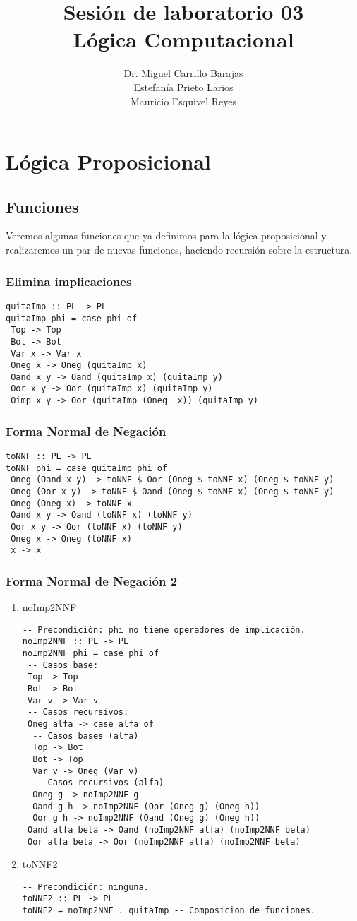 \documentclass[11pt]{article}
\author{Dr. Miguel Carrillo Barajas \\
Estefanía Prieto Larios \\
Mauricio Esquivel Reyes \\
}
\date{}
\title{Sesión de laboratorio 03 \\
Lógica Computacional}
\begin{document}
\maketitle
\section{Lógica Proposicional}
\label{sec:orgcdc3468}
\subsection{Funciones}
\label{sec:org6827b8f}
Veremos algunas funciones que ya definimos para la lógica proposicional y 
realizaremos un par de nuevas funciones, haciendo recursión sobre la estructura.
\subsubsection{Elimina implicaciones}
\label{sec:org8fbe9b7}
\begin{verbatim}
quitaImp :: PL -> PL
quitaImp phi = case phi of
 Top -> Top
 Bot -> Bot
 Var x -> Var x
 Oneg x -> Oneg (quitaImp x)
 Oand x y -> Oand (quitaImp x) (quitaImp y)
 Oor x y -> Oor (quitaImp x) (quitaImp y)
 Oimp x y -> Oor (quitaImp (Oneg  x)) (quitaImp y)
\end{verbatim}
\subsubsection{Forma Normal de Negación}
\label{sec:org7b1a26e}
\begin{verbatim}
toNNF :: PL -> PL
toNNF phi = case quitaImp phi of
 Oneg (Oand x y) -> toNNF $ Oor (Oneg $ toNNF x) (Oneg $ toNNF y)
 Oneg (Oor x y) -> toNNF $ Oand (Oneg $ toNNF x) (Oneg $ toNNF y)
 Oneg (Oneg x) -> toNNF x
 Oand x y -> Oand (toNNF x) (toNNF y)
 Oor x y -> Oor (toNNF x) (toNNF y)
 Oneg x -> Oneg (toNNF x)
 x -> x
\end{verbatim}
\subsubsection{Forma Normal de Negación 2}
\label{sec:org49cd8e2}
\begin{enumerate}
\item noImp2NNF
\label{sec:org2b92bae}
\begin{verbatim}
-- Precondición: phi no tiene operadores de implicación.
noImp2NNF :: PL -> PL
noImp2NNF phi = case phi of
 -- Casos base:
 Top -> Top
 Bot -> Bot
 Var v -> Var v
 -- Casos recursivos:
 Oneg alfa -> case alfa of
  -- Casos bases (alfa)
  Top -> Bot
  Bot -> Top
  Var v -> Oneg (Var v)
  -- Casos recursivos (alfa)
  Oneg g -> noImp2NNF g
  Oand g h -> noImp2NNF (Oor (Oneg g) (Oneg h))
  Oor g h -> noImp2NNF (Oand (Oneg g) (Oneg h))
 Oand alfa beta -> Oand (noImp2NNF alfa) (noImp2NNF beta)
 Oor alfa beta -> Oor (noImp2NNF alfa) (noImp2NNF beta)
\end{verbatim}
\item toNNF2
\label{sec:orgf27a971}
\begin{verbatim}
-- Precondición: ninguna.
toNNF2 :: PL -> PL
toNNF2 = noImp2NNF . quitaImp -- Composicion de funciones.
\end{verbatim}
\end{enumerate}
\end{document}
